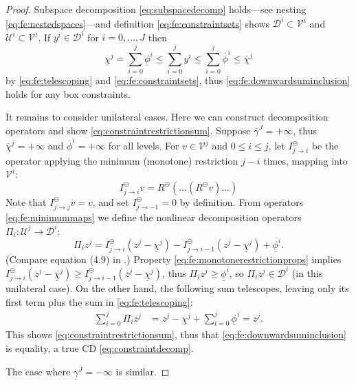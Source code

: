 \documentclass[letterpaper,final,12pt,reqno]{amsart}
\theoremstyle{cstyle}
\theoremstyle{cstyle*}
\theoremstyle{dstyle}
\numberwithin{equation}{section}
\numberwithin{figure}{section}
\numberwithin{table}{section}
\numberwithin{theorem}{section}
\newcommand{\cV}{\mathcal{V}}
\newcommand{\minR}{R^{\bm{\ominus}}}
\begin{document}
\begin{proof}  Subspace decomposition \eqref{eq:subspacedecomp} holds---see nesting \eqref{eq:fe:nestedspaces}---and definition \eqref{eq:fe:constraintsets} shows $\mathcal{D}^i \subset \cV^i$ and $\mathcal{U}^i \subset \cV^i$.  If $y^i \in \mathcal{D}^i$ for $i=0,\dots,J$ then
\begin{equation}
\underline{\chi}^j = \sum_{i=0}^j \underline{\phi}^i \le \sum_{i=0}^j y^i \le \sum_{i=0}^j \overline{\phi}^i \le \overline{\chi}^j \label{eq:fe:lemmaordering}
\end{equation}
by \eqref{eq:fe:telescoping} and \eqref{eq:fe:constraintsets}, thus \eqref{eq:fe:downwardsuminclusion} holds for any box constraints.

It remains to consider unilateral cases.  Here we can construct decomposition operators and show \eqref{eq:constraintrestrictionsum}.  Suppose $\overline{\gamma}^J=+\infty$, thus $\overline{\chi}^j=+\infty$ and $\overline{\phi}^i = +\infty$ for all levels.  For $v\in \mathcal{V}^j$ and $0\le i \le j$, let $I_{j\to i}^\ominus$ be the operator applying the minimum (monotone) restriction $j-i$ times, mapping into $\mathcal{V}^i$:
\begin{equation}
I_{j\to i}^\ominus v = \minR(\dots(\minR v)\dots)  \label{eq:fe:minimummaps}
\end{equation}
Note that $I_{j\to j}^\ominus v = v$, and set $I_{j\to -1}^\ominus=0$ by definition.  From operators \eqref{eq:fe:minimummaps} we define the nonlinear decomposition operators $\Pi_i:\mathcal{U}^j \to \mathcal{D}^i$:
\begin{equation}
\Pi_i z^j = I_{j\to i}^\ominus(z^j - \underline{\chi}^j) - I_{j\to i-1}^\ominus(z^j - \underline{\chi}^j) + \underline{\phi}^i.  \label{eq:fe:unilateraldecompositionoperator}
\end{equation}
(Compare equation (4.9) in \cite{GraeserKornhuber2009}.)  Property \eqref{eq:fe:monotonerestrictionprops} implies $I_{j\to i}^\ominus(z^j - \underline{\chi}^j) \ge I_{j\to i-1}^\ominus(z^j - \underline{\chi}^j)$, thus $\Pi_i z^j \ge \underline{\phi}^i$, so $\Pi_i z^j \in \mathcal{D}^i$ (in this unilateral case).  On the other hand, the following sum telescopes, leaving only its first term plus the sum in \eqref{eq:fe:telescoping}:
\begin{align*}
\sum_{i=0}^j \Pi_i z^j &= z^j - \underline{\chi}^j + \sum_{i=0}^j \underline{\phi}^i = z^j.
\end{align*}
This shows \eqref{eq:constraintrestrictionsum}, thus that \eqref{eq:fe:downwardsuminclusion} is equality, a true CD \eqref{eq:constraintdecomp}.

The case where $\underline{\gamma}^J=-\infty$ is similar.
\end{proof}
\end{document}
